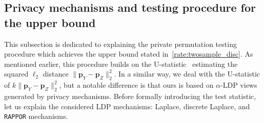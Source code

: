 \documentclass[twoside,11pt]{article}
\newcommand{\rvTwo}{Y}
\newcommand{\rvThree}{Z}
\newcommand{\alphabetSize}{k} %
\newcommand{\probVec}{\mathbf{p}} %
\newcommand{\privacyParameter}{\alpha} %
\begin{document}
\subsection{Privacy mechanisms and testing procedure for the upper bound}\label{subsection:twosample_disc_upperbound}
This subsection is dedicated to explaining the private permutation testing procedure which achieves the upper bound stated in~\eqref{rate:twosample_disc}. As mentioned earlier, this procedure builds on the U-statistic~\citep{kim_minimax_2022} estimating the squared $\ell_2$ distance $\| \probVec_\rvTwo - \probVec_\rvThree \|_2^2$.
In a similar way, we deal with the U-statistic of $\alphabetSize \| \probVec_\rvTwo - \probVec_\rvThree \|_2^2$, but a notable difference is that ours is based on $\privacyParameter$-LDP views generated by privacy mechanisms. Before formally introducing the test statistic, let us explain the considered LDP mechanisms: Laplace, discrete Laplace, and \texttt{RAPPOR} mechanisms.
\end{document}
